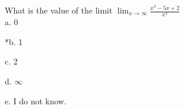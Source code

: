 
What is the value of the limit
$\displaystyle \lim_{x \rightarrow \infty}\frac{x^{3} - 5x + 2}{x^{3}}$\\

a. 0

*b. 1

c. 2

d. $\infty$

e. I do not know.\\
